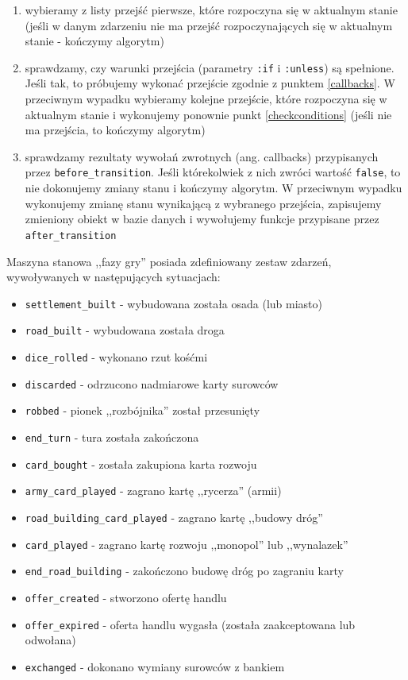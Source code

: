 \documentclass[a4paper,12pt]{article}
\begin{document}
\begin{enumerate}
\item wybieramy z listy przejść pierwsze, które rozpoczyna się w
  aktualnym stanie (jeśli w danym zdarzeniu nie ma przejść
  rozpoczynających się w aktualnym stanie - kończymy
  algorytm) \label{selectfirst}
\item sprawdzamy, czy warunki przejścia (parametry \texttt{:if} i
  \texttt{:unless}) są spełnione\label{checkconditions}. Jeśli tak, to
  próbujemy wykonać przejście zgodnie z punktem \ref{callbacks}. W
  przeciwnym wypadku wybieramy kolejne przejście, które rozpoczyna się
  w aktualnym stanie i wykonujemy ponownie punkt \ref{checkconditions}
  (jeśli nie ma przejścia, to kończymy algorytm)
\item sprawdzamy rezultaty wywołań zwrotnych (ang. callbacks)
  przypisanych przez \texttt{before\_transition}. Jeśli którekolwiek z
  nich zwróci wartość \texttt{false}, to nie dokonujemy zmiany stanu i
  kończymy algorytm. W przeciwnym wypadku wykonujemy zmianę stanu
  wynikającą z wybranego przejścia, zapisujemy zmieniony obiekt w
  bazie danych i wywołujemy funkcje przypisane przez
  \texttt{after\_transition} \label{callbacks}
\end{enumerate}

Maszyna stanowa ,,fazy gry'' posiada zdefiniowany zestaw zdarzeń,
wywoływanych w następujących sytuacjach:

\begin{itemize}
\item \texttt{settlement\_built} - wybudowana została osada (lub miasto)
\item \texttt{road\_built} - wybudowana została droga
\item \texttt{dice\_rolled} - wykonano rzut kośćmi
\item \texttt{discarded} - odrzucono nadmiarowe karty surowców
\item \texttt{robbed} - pionek ,,rozbójnika'' został przesunięty
\item \texttt{end\_turn} - tura została zakończona
\item \texttt{card\_bought} - została zakupiona karta rozwoju
\item \texttt{army\_card\_played} - zagrano kartę ,,rycerza'' (armii)
\item \texttt{road\_building\_card\_played} - zagrano kartę ,,budowy
  dróg''
\item \texttt{card\_played} - zagrano kartę rozwoju ,,monopol'' lub
  ,,wynalazek''
\item \texttt{end\_road\_building} - zakończono budowę dróg po
  zagraniu karty
\item \texttt{offer\_created} - stworzono ofertę handlu
\item \texttt{offer\_expired} - oferta handlu wygasła (została
  zaakceptowana lub odwołana)
\item \texttt{exchanged} - dokonano wymiany surowców z bankiem
\end{itemize}
\end{document}
